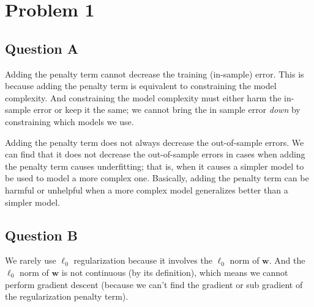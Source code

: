 \documentclass{article}
\newcommand*{\wb}{\ensuremath{\mathbf{w}}}
\begin{document}
\section*{Problem 1}

\subsection*{Question A}
Adding the penalty term cannot decrease the training (in-sample) error. This
is because adding the penalty term is equivalent to constraining the model
complexity. And constraining the model complexity must either harm the in-sample
error or keep it the same; we cannot bring the in sample error \textit{down}
by constraining which models we use.

Adding the penalty term does not always decrease the out-of-sample errors. We
can find that it does not decrease the out-of-sample errors
in cases when adding the penalty term causes underfitting; that is, when
it causes a simpler model to be used to model a more complex one. Basically,
adding the penalty term can be harmful or unhelpful when a more complex
model generalizes better than a simpler model.

\subsection*{Question B}
We rarely use $\ell_0$ regularization because it involves the $\ell_0$ norm of
$\wb$. And the $\ell_0$ norm of $\wb$ is not continuous (by its definition),
which means we cannot perform gradient descent (because we can't find the gradient
or sub gradient of the regularization penalty term).
\end{document}
